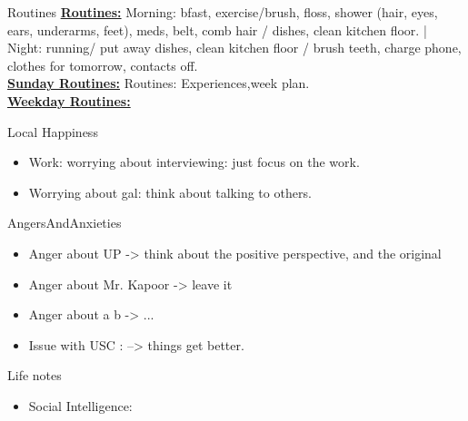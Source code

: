 \begin{columns}
    \begin{column}{0.25\linewidth}
      \begin{block}{Routines}
        { \tiny \underline{\bf Routines:} Morning: bfast, exercise/brush,
          floss, shower (hair, eyes, ears, underarms, feet), meds, belt,
          comb hair / dishes, clean kitchen floor. |  Night: running/ put
          away dishes, clean kitchen floor / brush teeth, charge phone,
          clothes for tomorrow, contacts off.}\\
        {\tiny \underline{\bf Sunday Routines:} Routines: Experiences,week plan.}\\ 
        {\tiny \underline{\bf Weekday Routines:}}\\
      \end{block} 
      \begin{block}{Local Happiness}
        \begin{itemize} 
          \tiny \item \tiny Work: worrying about interviewing: just focus on the work. 
        \item \tiny Worrying about gal: think about talking to others. 
        \end{itemize}
      \end{block} 
      \begin{block}{AngersAndAnxieties}
        \begin{itemize}
          \tiny \item \tiny Anger about UP -> think about the positive
          perspective, and the original
        \item \tiny Anger about Mr. Kapoor ->  leave it
        \item \tiny Anger about a b  -> ...
        \item \tiny Issue with USC : --> things get better. 
        \end{itemize}
      \end{block}
      \begin{block}{Life notes}
        \begin{itemize}
          \tiny \item \tiny Social Intelligence: 
        \end{itemize}
      \end{block}


\end{column}
\end{columns}
